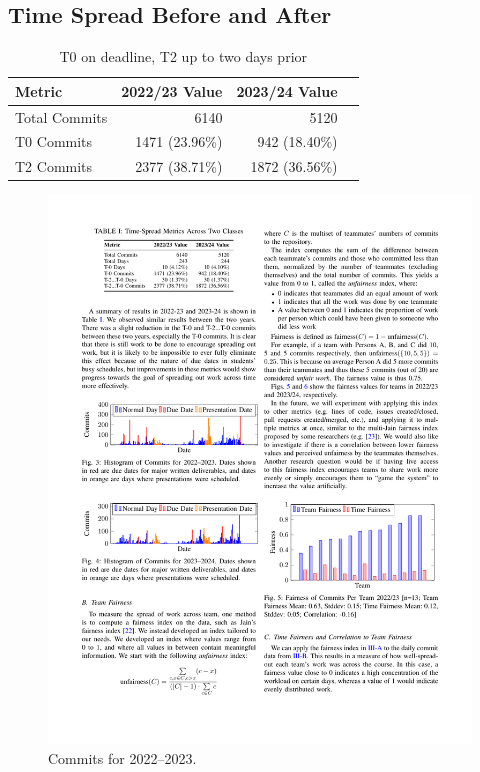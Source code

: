 \documentclass[poster, a1, plainboxedsections]{sciposter}
\begin{document}
\begin{multicols}{2}

\section{Time Spread Before and After}

\begin{table}
\caption{T0 on deadline, T2 up to two days prior}
\centering
\begin{tabular}{@{}lrrr@{}}
\toprule
\textbf{Metric} & \textbf{2022/23 Value} & \textbf{2023/24 Value} \\ 
\midrule
Total Commits & 6140 & 5120 \\
T0 Commits & 1471 (23.96\%) & 942 (18.40\%) \\
T2 Commits & 2377 (38.71\%) & 1872 (36.56\%) \\ 
\bottomrule
\end{tabular}
\end{table}

\begin{figure}[h!]
\centering
\includegraphics[width=1.0\linewidth]{../figures/HistCommits2022-23.pdf}
\caption{Commits for 2022--2023.}\label{Fig_22_23Timeline}
\end{figure}


\end{multicols}
\end{document}
